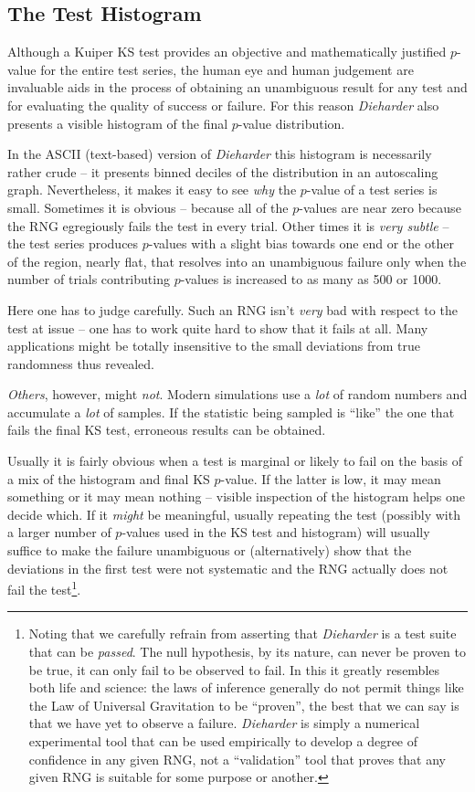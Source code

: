 \documentclass[12pt]{article}
\begin{document}
\subsection{The Test Histogram}

Although a Kuiper KS test provides an objective and mathematically
justified $p$-value for the entire test series, the human eye and human
judgement are invaluable aids in the process of obtaining an unambiguous
result for any test and for evaluating the quality of success or
failure.  For this reason {\em Dieharder} also presents a visible
histogram of the final $p$-value distribution.

In the ASCII (text-based) version of {\em Dieharder} this histogram is
necessarily rather crude -- it presents binned deciles of the
distribution in an autoscaling graph.  Nevertheless, it makes it easy to
see {\em why} the $p$-value of a test series is small.  Sometimes it is
obvious -- because all of the $p$-values are near zero because the RNG
egregiously fails the test in every trial.  Other times it is {\em very
subtle} -- the test series produces $p$-values with a slight bias
towards one end or the other of the region, nearly flat, that resolves
into an unambiguous failure only when the number of trials contributing
$p$-values is increased to as many as 500 or 1000.

Here one has to judge carefully.  Such an RNG isn't {\em very} bad with
respect to the test at issue -- one has to work quite hard to show that
it fails at all.  Many applications might be totally insensitive to the
small deviations from true randomness thus revealed.

{\em Others}, however, might {\em not}.  Modern simulations use a {\em
lot} of random numbers and accumulate a {\em lot} of samples.  If the
statistic being sampled is ``like'' the one that fails the final KS
test, erroneous results can be obtained.

Usually it is fairly obvious when a test is marginal or likely to fail
on the basis of a mix of the histogram and final KS $p$-value.  If the
latter is low, it may mean something or it may mean nothing -- visible
inspection of the histogram helps one decide which.  If it {\em might}
be meaningful, usually repeating the test (possibly with a larger number
of $p$-values used in the KS test and histogram) will usually suffice to
make the failure unambiguous or (alternatively) show that the deviations
in the first test were not systematic and the RNG actually does not fail
the test\footnote{Noting that we carefully refrain from asserting that
{\em Dieharder} is a test suite that can be {\em passed}.  The null
hypothesis, by its nature, can never be proven to be true, it can only
fail to be observed to fail.  In this it greatly resembles both life and
science: the laws of inference generally do not permit things like the
Law of Universal Gravitation to be ``proven'', the best that we can say
is that we have yet to observe a failure.  {\em Dieharder} is simply a
numerical experimental tool that can be used empirically to develop a
degree of confidence in any given RNG, not a ``validation'' tool that
proves that any given RNG is suitable for some purpose or another.}.
\end{document}
